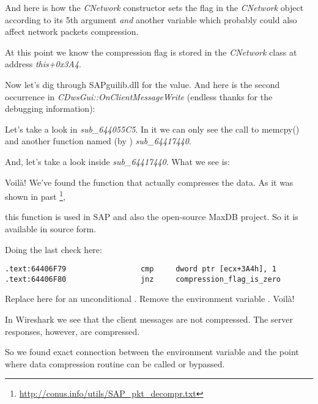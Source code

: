 And here is how the \emph{CNetwork} constructor sets the flag in the \emph{CNetwork} object according to its 5th argument \emph{and}
another variable which probably could also affect network packets compression.



At this point we know the compression flag is stored in the \emph{CNetwork} class at address \emph{this+0x3A4}.

Now let's dig through SAPguilib.dll for the  value. And here is the second occurrence in 
\emph{CDwsGui::OnClientMessageWrite} (endless thanks for the debugging information):



Let's take a look in \emph{sub\_644055C5}. In it we can only see the call to memcpy() and another function named 
(by \IDA) \emph{sub\_64417440}.

And, let's take a look inside \emph{sub\_64417440}. What we see is:



Voilà! We've found the function that actually compresses the data.
As it was shown in past
\footnote{\url{http://conus.info/utils/SAP_pkt_decompr.txt}},

this function is used in SAP and also the open-source MaxDB project. 
So it is available in source form.

Doing the last check here:

\begin{lstlisting}[style=customasmx86]
.text:64406F79                 cmp     dword ptr [ecx+3A4h], 1
.text:64406F80                 jnz     compression_flag_is_zero
\end{lstlisting}

Replace \JNZ here for an unconditional \JMP. Remove the environment variable \TDWNC. Voilà!

In Wireshark we see that the client messages are not compressed. The server responses, however, are compressed.

So we found exact connection between the environment variable and the point where data compression 
routine can be called or bypassed.

